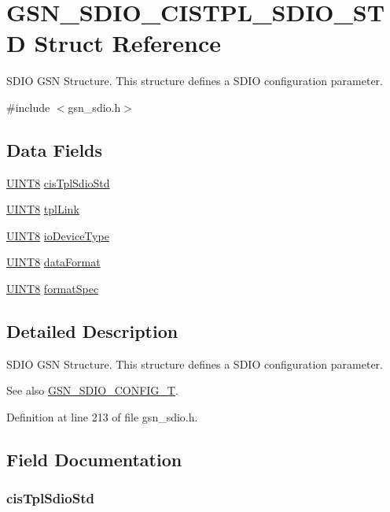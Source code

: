 \hypertarget{a00223}{
\section{GSN\_\-SDIO\_\-CISTPL\_\-SDIO\_\-STD Struct Reference}
\label{a00223}
}


SDIO GSN Structure. This structure defines a SDIO configuration parameter.  




{\ttfamily \#include $<$gsn\_\-sdio.h$>$}

\subsection*{Data Fields}
\begin{DoxyCompactItemize}
\item 
\hyperlink{a00660_gab27e9918b538ce9d8ca692479b375b6a}{UINT8} \hyperlink{a00223_a546504eecbfea3cdefa6cbe502fd969d}{cisTplSdioStd}
\item 
\hyperlink{a00660_gab27e9918b538ce9d8ca692479b375b6a}{UINT8} \hyperlink{a00223_a8f4c489c1bbdea21ed6588bcd2dda63e}{tplLink}
\item 
\hyperlink{a00660_gab27e9918b538ce9d8ca692479b375b6a}{UINT8} \hyperlink{a00223_a5eaf95b34bc581c463dc891b48eb6d76}{ioDeviceType}
\item 
\hyperlink{a00660_gab27e9918b538ce9d8ca692479b375b6a}{UINT8} \hyperlink{a00223_ae752dd447932365e49384c3e7c27e5c5}{dataFormat}
\item 
\hyperlink{a00660_gab27e9918b538ce9d8ca692479b375b6a}{UINT8} \hyperlink{a00223_a2366f215f23500dc9edf45590e35b028}{formatSpec}
\end{DoxyCompactItemize}


\subsection{Detailed Description}
SDIO GSN Structure. This structure defines a SDIO configuration parameter. 

\begin{DoxySeeAlso}{See also}
\hyperlink{a00653_ga741fda4dc2cd93143a8a73ddaace7de8}{GSN\_\-SDIO\_\-CONFIG\_\-T}. 
\end{DoxySeeAlso}


Definition at line 213 of file gsn\_\-sdio.h.



\subsection{Field Documentation}
\hypertarget{a00223_a546504eecbfea3cdefa6cbe502fd969d}{
\subsubsection[{cisTplSdioStd}]{ {\bf cisTplSdioStd}}}
\label{a00223_a546504eecbfea3cdefa6cbe502fd969d}


